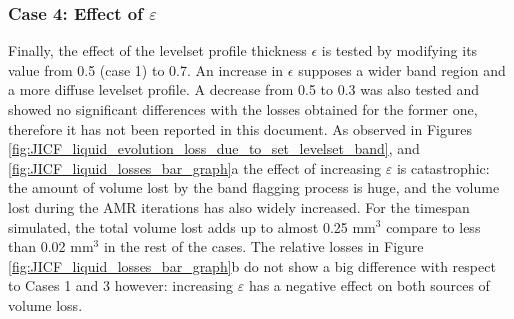 
\subsubsection*{Case 4: Effect of $\varepsilon$}

Finally, the effect of the levelset profile thickness $\epsilon$ is tested by modifying its value from 0.5 (case 1) to 0.7. An increase in $\epsilon$ supposes a wider band region and a more diffuse levelset profile. A decrease from 0.5 to 0.3 was also tested and showed no significant differences with the losses obtained for the former one, therefore it has not been reported in this document. As observed in Figures \ref{fig:JICF_liquid_evolution_loss_due_to_set_levelset_band},
and \ref{fig:JICF_liquid_losses_bar_graph}a the effect of increasing $\varepsilon$ is catastrophic: the amount of volume lost by the band flagging process is huge, and the volume lost during the AMR iterations has also widely increased. For the timespan simulated, the total volume lost adds up to almost 0.25 mm$^3$ compare to less than 0.02 mm$^3$ in the rest of the cases. The relative losses in Figure \ref{fig:JICF_liquid_losses_bar_graph}b do not show a big difference with respect to Cases 1 and 3 however: increasing $\varepsilon$ has a negative effect on both sources of volume loss. \\




